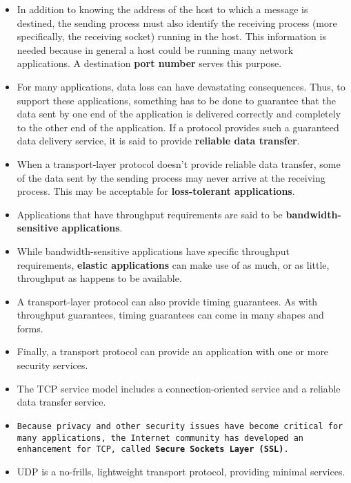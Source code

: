 \begin{itemize}
\item In addition to knowing the address of the host to which a message is destined, the sending process must also identify the receiving process (more specifically, the receiving socket) running in the host. This information is needed because in general a host could be running many network applications. A destination \textbf{port number} serves this purpose.

\item For many applications, data loss can have devastating consequences. Thus, to support these applications, something has to be done to guarantee that the data sent by one end of the application is delivered correctly and completely to the other end of the application. If a protocol provides such a guaranteed data delivery service, it is said to provide \textbf{reliable data transfer}.

\item When a transport-layer protocol doesn't provide reliable data transfer, some of the data sent by the sending process may never arrive at the receiving process. This may be acceptable for \textbf{loss-tolerant applications}.

\item Applications that have throughput requirements are said to be \textbf{bandwidth-sensitive applications}.

\item While bandwidth-sensitive applications have specific throughput requirements, \textbf{elastic applications} can make use of as much, or as little, throughput as happens to be available.

\item A transport-layer protocol can also provide timing guarantees. As with throughput guarantees, timing guarantees can come in many shapes and forms.

\item Finally, a transport protocol can provide an application with one or more security services.

\item The TCP service model includes a connection-oriented service and a reliable data transfer service.

\item \texttt{Because privacy and other security issues have become critical for many applications, the Internet community has developed an enhancement for TCP, called \textbf{Secure Sockets Layer (SSL)}.}

\item UDP is a no-frills, lightweight transport protocol, providing minimal services.


\end{itemize}
